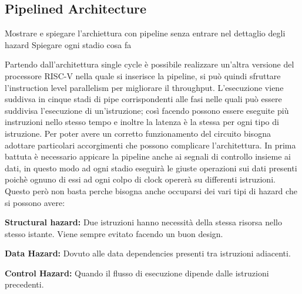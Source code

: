 \subsection{Pipelined Architecture}
Mostrare e spiegare l'archiettura con pipeline senza entrare nel dettaglio degli hazard
Spiegare ogni stadio cosa fa

Partendo dall'architettura single cycle è possibile realizzare un'altra versione del processore RISC-V nella quale si inserisce la pipeline, si può quindi sfruttare l'instruction level parallelism per migliorare il throughput. L'esecuzione viene suddivsa in cinque stadi di pipe corrispondenti alle fasi nelle quali può essere suddivisa l'esecuzione di un'istruzione; così facendo possono essere eseguite più instruzioni nello stesso tempo e inoltre la latenza è la stessa per ogni tipo di istruzione.
Per poter avere un corretto funzionamento del circuito bisogna adottare particolari accorgimenti che possono complicare l'architettura. In prima battuta è necessario appicare la pipeline anche ai segnali di controllo insieme ai dati, in questo modo ad ogni stadio eseguirà le giuste operazioni sui dati presenti poichè ognuno di essi ad ogni colpo di clock opererà su differenti istruzioni.
Questo però non basta perche bisogna anche occuparsi dei vari tipi di hazard che si possono avere:
\begin{description}
\item \textbf{Structural hazard:} Due istruzioni hanno necessità della stessa risorsa nello stesso istante. Viene sempre evitato facendo un buon design.

\item \textbf{Data Hazard:} Dovuto alle data dependencies presenti tra istruzioni adiacenti.

\item \textbf{Control Hazard:} Quando il flusso di esecuzione dipende dalle istruzioni precedenti.
\end{description}
